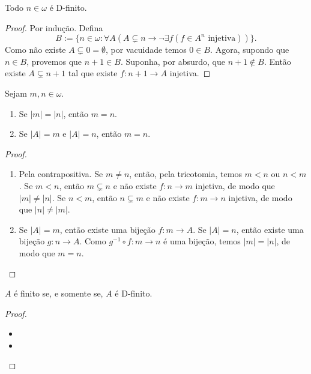 \begin{proposition}
    Todo $n \in \omega$ é D-finito.
\end{proposition}

\begin{proof}
    Por indução. Defina
        \[
            B := \{n \in \omega : \forall A (A \subsetneq n \rightarrow \neg \exists f (f \in A^n \text{ injetiva}) ) \}.
        \]
    Como não existe $A \subsetneq 0 = \emptyset$, por vacuidade temos $0 \in B$. Agora, supondo que $n \in B$, provemos que $n+1 \in B$. Suponha, por absurdo, que $n+1 \notin B$. Então existe $A \subsetneq n+1$ tal que existe $f : n+1 \to A$ injetiva.
\end{proof}

\begin{corollary}
    Sejam $m,n \in \omega$.
        \begin{enumerate}[leftmargin=*, align=left, label=\textbf{(\alph*)}]
            \item Se $|m| = |n|$, então $m=n$.
            \item Se $|A| = m$ e $|A|=n$, então $m=n$.
        \end{enumerate}
\end{corollary}

\begin{proof}
    \leavevmode
        \begin{enumerate}[leftmargin=*, align=left, label=\textbf{(\alph*)}]
            \item Pela contrapositiva. Se $m \neq n$, então, pela tricotomia, temos $m < n$ ou $n < m$. Se $m < n$, então $m \subsetneq n$ e não existe $f : n \to m$ injetiva, de modo que $|m| \neq |n|$. Se $n < m$, então $n \subsetneq m$ e não existe $f : m \to n$ injetiva, de modo que $|n| \neq |m|$. \blackproof 
            \item Se $|A| = m$, então existe uma bijeção $f : m \to A$. Se $|A| = n$, então existe uma bijeção $g : n \to A$. Como $g^{-1} \circ f : m \to n$ é uma bijeção, temos $|m| = |n|$, de modo que $m=n$. \blackproof
        \end{enumerate}
\end{proof}

\begin{theorem}
    $A$ é finito se, e somente se, $A$ é D-finito.
\end{theorem}

\begin{proof}
    \leavevmode
        \begin{itemize}[align=left]
            \item[($\Rightarrow$)]
            \item[($\Leftarrow$)]  
        \end{itemize}
\end{proof}

